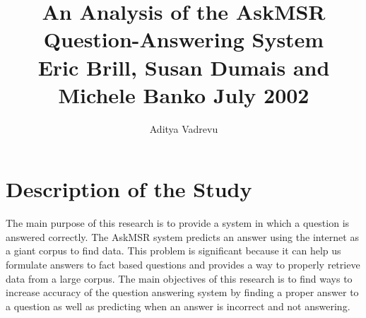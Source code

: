 \documentclass[journal, a4paper]{IEEEtran}
\begin{document}
	\title{An Analysis of the AskMSR Question-Answering System\\ Eric Brill, Susan Dumais and Michele Banko  July 2002}
	\author{Aditya Vadrevu}{}
	\maketitle
\section{Description of the Study} 
The main purpose of this research is to provide a system in which a question is answered correctly. The AskMSR system predicts an answer using the internet as a giant corpus to find data. This problem is significant because it can help us formulate answers to fact based questions and provides a way to properly retrieve data from a large corpus. The main objectives of this research is to find ways to increase accuracy of the question answering system by finding a proper answer to a question as well as predicting when an answer is incorrect and not answering.


\end{document}
